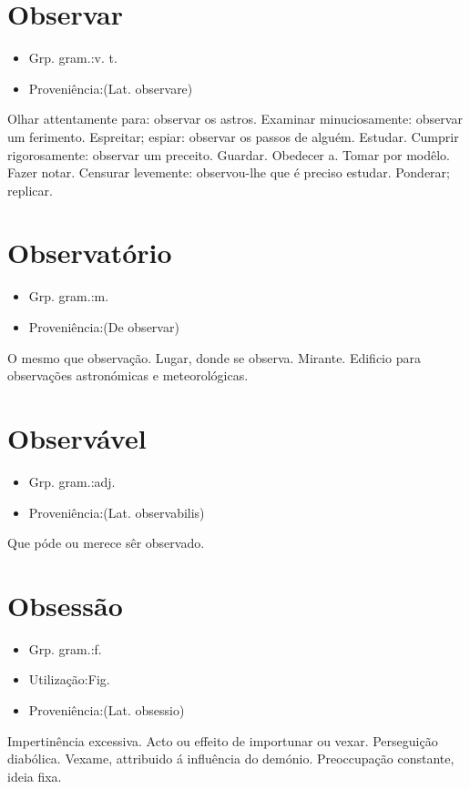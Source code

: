 \section{Observar}
\begin{itemize}
\item {Grp. gram.:v. t.}
\end{itemize}
\begin{itemize}
\item {Proveniência:(Lat. \textunderscore observare\textunderscore )}
\end{itemize}
Olhar attentamente para: \textunderscore observar os astros\textunderscore .
Examinar minuciosamente: \textunderscore observar um ferimento\textunderscore .
Espreitar; espiar: \textunderscore observar os passos de alguém\textunderscore .
Estudar.
Cumprir rigorosamente: \textunderscore observar um preceito\textunderscore .
Guardar.
Obedecer a.
Tomar por modêlo.
Fazer notar.
Censurar levemente: \textunderscore observou-lhe que é preciso estudar\textunderscore .
Ponderar; replicar.
\section{Observatório}
\begin{itemize}
\item {Grp. gram.:m.}
\end{itemize}
\begin{itemize}
\item {Proveniência:(De \textunderscore observar\textunderscore )}
\end{itemize}
O mesmo que \textunderscore observação\textunderscore .
Lugar, donde se observa.
Mirante.
Edificio para observações astronómicas e meteorológicas.
\section{Observável}
\begin{itemize}
\item {Grp. gram.:adj.}
\end{itemize}
\begin{itemize}
\item {Proveniência:(Lat. \textunderscore observabilis\textunderscore )}
\end{itemize}
Que póde ou merece sêr observado.
\section{Obsessão}
\begin{itemize}
\item {Grp. gram.:f.}
\end{itemize}
\begin{itemize}
\item {Utilização:Fig.}
\end{itemize}
\begin{itemize}
\item {Proveniência:(Lat. \textunderscore obsessio\textunderscore )}
\end{itemize}
Impertinência excessiva.
Acto ou effeito de importunar ou vexar.
Perseguição diabólica.
Vexame, attribuido á influência do demónio.
Preoccupação constante, ideia fixa.
